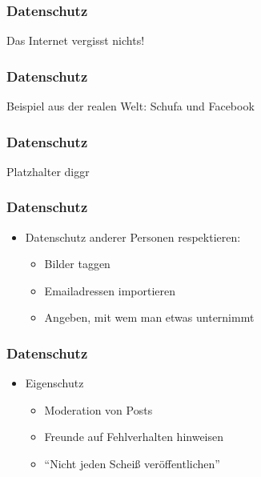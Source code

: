 \documentclass[12pt]{beamer}
\begin{document}
\begin{frame}
  \frametitle{Datenschutz}

  \begin{center} \Large
   Das Internet vergisst nichts!
  \end{center}
\end{frame}

\begin{frame}
  \frametitle{Datenschutz}

  \begin{center} \Large
   Beispiel aus der realen Welt: Schufa und Facebook
  \end{center}
\end{frame}

\begin{frame}
  \frametitle{Datenschutz}

  \begin{center} \Large
   Platzhalter diggr
  \end{center}
\end{frame}

\begin{frame}
  \frametitle{Datenschutz}

  \begin{itemize}
    \item Datenschutz anderer Personen respektieren:
      \begin{itemize}
        \item<1->Bilder taggen
        \item<2->Emailadressen importieren
        \item<3->Angeben, mit wem man etwas unternimmt
      \end{itemize}
  \end{itemize}
\end{frame}

\begin{frame}
  \frametitle{Datenschutz}

  \begin{itemize}
    \item Eigenschutz
      \begin{itemize}
        \item<1->Moderation von Posts
        \item<2->Freunde auf Fehlverhalten hinweisen
        \item<3->"`Nicht jeden Scheiß veröffentlichen"'
      \end{itemize}
  \end{itemize}
\end{frame}
\end{document}
